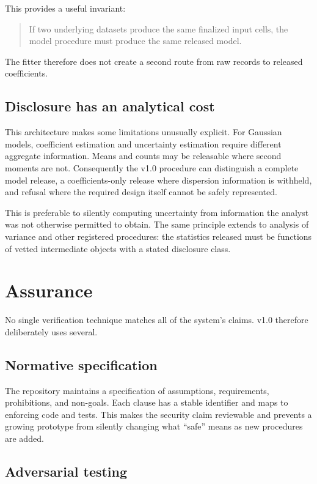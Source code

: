 \documentclass[11pt,a4paper]{article}
\begin{document}
This provides a useful invariant:

\begin{quote}
If two underlying datasets produce the same finalized input cells, the model
procedure must produce the same released model.
\end{quote}

The fitter therefore does not create a second route from raw records to
released coefficients.

\subsection{Disclosure has an analytical cost}

This architecture makes some limitations unusually explicit. For Gaussian
models, coefficient estimation and uncertainty estimation require different
aggregate information. Means and counts may be releasable where second moments
are not. Consequently the v1.0 procedure can distinguish a complete model
release, a coefficients-only release where dispersion information is withheld,
and refusal where the required design itself cannot be safely represented.

This is preferable to silently computing uncertainty from information the
analyst was not otherwise permitted to obtain. The same principle extends to
analysis of variance and other registered procedures: the statistics released
must be functions of vetted intermediate objects with a stated disclosure
class.

\section{Assurance}
\label{sec:assurance}

No single verification technique matches all of the system's claims. v1.0
therefore deliberately uses several.

\subsection{Normative specification}

The repository maintains a specification of assumptions, requirements,
prohibitions, and non-goals. Each clause has a stable identifier and maps to
enforcing code and tests. This makes the security claim reviewable and prevents
a growing prototype from silently changing what ``safe'' means as new
procedures are added.

\subsection{Adversarial testing}
\label{sec:redteam}
\end{document}
